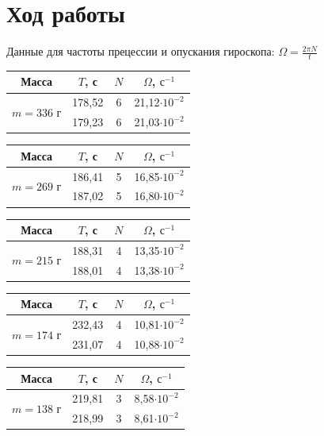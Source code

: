 \documentclass[a4paper,12pt]{article}
\begin{document}
	\section{Ход работы}
	Данные для частоты прецессии и опускания гироскопа: $\Omega=\frac{2\pi N}{t}$
	
	\begin{center}
		\begin{tabular}{|c|c|c|c|}
			\hline
			Масса & $T$, с& $N$ & $\Omega$, $\text{с}^{-1}$  \\
			\hline
			\multirow{2}{*}{$m = 336$ г}&178,52&6&21,12$\cdot 10^{-2}$ \\
			\cline{2-4}
			&179,23 & 6 &21,03$\cdot 10^{-2}$  \\
			\hline
		\end{tabular}
		\quad
		\begin{tabular}{|c|c|c|c|}
			\hline
			Масса & $T$, с& $N$ & $\Omega$, $\text{с}^{-1}$ \\
			\hline
			\multirow{2}{*}{$m = 269$ г}&186,41&5&16,85$\cdot 10^{-2}$ \\
			\cline{2-4}
			&187,02 & 5 &16,80$\cdot 10^{-2}$  \\
			\hline
		\end{tabular}
	\end{center}
	
	\begin{center}
		\begin{tabular}{|c|c|c|c|}
			\hline
			Масса & $T$, с& $N$ &$\Omega$, $\text{с}^{-1}$ \\
			\hline
			\multirow{2}{*}{$m = 215$ г}&188,31&4& 13,35$\cdot 10^{-2}$ \\
			\cline{2-4}
			&188,01 & 4 &13,38$\cdot 10^{-2}$  \\
			\hline
		\end{tabular}
		\quad
		\begin{tabular}{|c|c|c|c|}
			\hline
			Масса & $T$, с& $N$ &$\Omega$, $\text{с}^{-1}$ \\
			\hline
			\multirow{2}{*}{$m = 174$ г}&232,43&4&10,81$\cdot 10^{-2}$ \\
			\cline{2-4}
			&231,07 & 4 &10,88$\cdot 10^{-2}$  \\
			\hline
		\end{tabular}
	\end{center}
	
	\begin{center}
		\begin{tabular}{|c|c|c|c|}
			\hline
			Масса & $T$, с& $N$ &$\Omega$, $\text{с}^{-1}$ \\
			\hline
			\multirow{2}{*}{$m = 138$ г}&219,81&3&8,58$\cdot 10^{-2}$ \\
			\cline{2-4}
			&218,99 & 3 &8,61$\cdot 10^{-2}$  \\
			\hline
		\end{tabular}
	\end{center}
	
\end{document}
